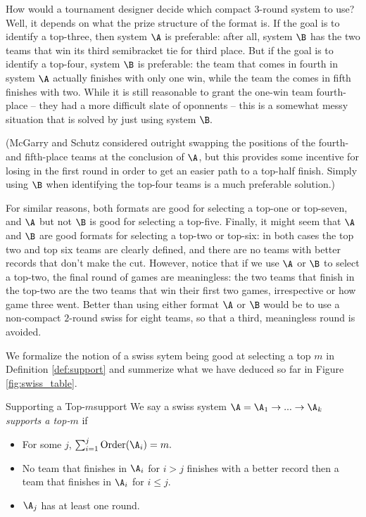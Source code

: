 {    How would a tournament designer decide which compact 3-round system to use? Well, it depends on what the prize structure of the format is. If the goal is to identify a top-three, then system $\A$ is preferable: after all, system $\B$ has the two teams that win its third semibracket tie for third place. But if the goal is to identify a top-four, system $\B$ is preferable: the team that comes in fourth in system $\A$ actually finishes with only one win, while the team the comes in fifth finishes with two. While it is still reasonable to grant the one-win team fourth-place -- they had a more difficult slate of oponnents -- this is a somewhat messy situation that is solved by just using system $\B.$
    
    (McGarry and Schutz \cite{four_five_swap} considered outright swapping the positions of the fourth- and fifth-place teams at the conclusion of $\A$, but this provides some incentive for losing in the first round in order to get an easier path to a top-half finish. Simply using $\B$ when identifying the top-four teams is a much preferable solution.)

    For similar reasons, both formats are good for selecting a top-one or top-seven, and $\A$ but not $\B$ is good for selecting a top-five. Finally, it might seem that $\A$ and $\B$ are good formats for selecting a top-two or top-six: in both cases the top two and top six teams are clearly defined, and there are no teams with better records that don't make the cut. However, notice that if we use $\A$ or $\B$ to select a top-two, the final round of games are meaningless: the two teams that finish in the top-two are the two teams that win their first two games, irrespective or how game three went. Better than using either format $\A$ or $\B$ would be to use a non-compact $2$-round swiss for eight teams, so that a third, meaningless round is avoided.
    
    We formalize the notion of a swiss sytem being good at selecting a top $m$ in Definition \ref{def:support} and summerize what we have deduced so far in Figure \ref{fig:swiss_table}.

    \begin{definition}{Supporting a Top-$m$}{support}
        We say a swiss system $\A = \A_1 \to ... \to \A_k$ \textit{supports a top-$m$} if
        \begin{itemize}
            \item For some $j$, $\sum_{i=1}^j \textrm{Order}(\A_i) = m.$
            \item No team that finishes in $\A_i$ for $i > j$ finishes with a better record then a team that finishes in $\A_i$ for $i \leq j.$
            \item $\A_j$ has at least one round.
        \end{itemize}
    \end{definition}

}
